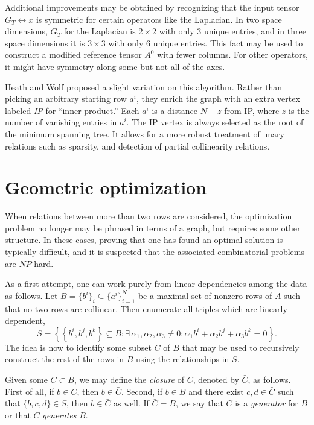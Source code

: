 Additional improvements may be obtained by recognizing that the input
tensor $ G_T \leftrightarrow x $ is symmetric for certain operators
like the Laplacian. In two space dimensions, $ G_T $ for the Laplacian
is $ 2 \times 2 $ with only 3 unique entries, and in three space
dimensions it is $ 3 \times 3 $ with only 6 unique entries.  This fact
may be used to construct a modified reference tensor $ A^0 $ with
fewer columns.  For other operators, it might have symmetry along some
but not all of the axes.

Heath and Wolf proposed a slight variation on this algorithm. Rather
than picking an arbitrary starting row $ a^i $, they enrich the graph
with an extra vertex labeled \textit{IP} for ``inner product.''  Each
$ a^i $ is a distance $ N - z $ from IP, where $ z $ is the number of
vanishing entries in $ a^i $.  The IP vertex is always selected as the
root of the minimum spanning tree.  It allows for a more robust
treatment of unary relations such as sparsity, and detection of
partial collinearity relations.

\section{Geometric optimization}
\label{sec:kirby-4:geom}

When relations between more than two rows are considered, the
optimization problem no longer may be phrased in terms of a graph, but
requires some other structure.  In these cases, proving that one has
found an optimal solution is typically difficult, and it is suspected
that the associated combinatorial problems are $ NP $-hard.

As a first attempt, one can work purely from linear dependencies among
the data as follows.  Let $ B=\{ b^i \}_i \subseteq \{ a^i \}_{i=1}^N
$ be a maximal set of nonzero rows of $ A $ such that no two rows are
collinear. Then enumerate all triples which are linearly dependent,
\begin{equation}
  S= \left\{ \left\{ b^i , b^j , b^k \right\} \subseteq B:
  \exists \, \alpha_1, \alpha_2, \alpha_3 \neq 0:
  \alpha_1 b^i + \alpha_2 b^j + \alpha_3 b^k = 0 \right\}.
\end{equation}
The idea is now to identify some subset $C$ of $ B $ that may be used
to recursively construct the rest of the rows in $ B $ using the
relationships in $ S $.

Given some $ C \subset B $, we may define the \emph{closure} of $
C $, denoted by $ \bar{C} $, as follows.  First of all, if $ b
\in C $, then $ b \in \bar{C} $.  Second, if $ b \in B $ and
there exist $ c,d \in \bar{C} $ such that $ \{b,c,d\} \in S $, then $
b \in \bar{C} $ as well.  If $ \bar{C} = B$, we say that $ C $ is
a \emph{generator} for $ B $ or that $ C $
\emph{generates} $ B $.

